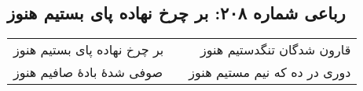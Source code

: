 \begin{center}
\section*{رباعی شماره ۲۰۸: بر چرخ نهاده پای بستیم هنوز}
\label{sec:sh208}
\begin{longtable}{l p{0.5cm} r}
بر چرخ نهاده پای بستیم هنوز
&&
قارون شدگان تنگدستیم هنوز
\\
صوفی شدهٔ بادهٔ صافیم هنوز
&&
دوری در ده که نیم مستیم هنوز
\\
\end{longtable}
\end{center}
